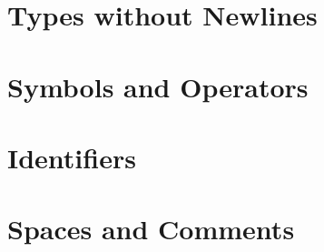 \section{Types without Newlines}


\section{Symbols and Operators}


\section{Identifiers}


\section{Spaces and Comments}


\normalsize
